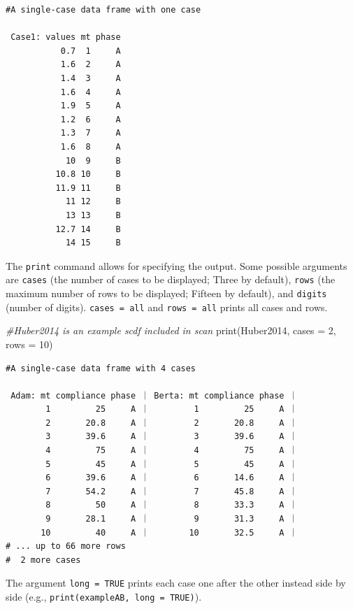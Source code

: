 \documentclass[
]{book}
\newenvironment{Shaded}{\begin{snugshade}}{\end{snugshade}}
\newcommand{\AttributeTok}[1]{\textcolor[rgb]{0.77,0.63,0.00}{#1}}
\newcommand{\CommentTok}[1]{\textcolor[rgb]{0.56,0.35,0.01}{\textit{#1}}}
\newcommand{\DecValTok}[1]{\textcolor[rgb]{0.00,0.00,0.81}{#1}}
\newcommand{\FunctionTok}[1]{\textcolor[rgb]{0.00,0.00,0.00}{#1}}
\newcommand{\NormalTok}[1]{#1}
\begin{document}
\begin{verbatim}
#A single-case data frame with one case

 Case1: values mt phase
           0.7  1     A
           1.6  2     A
           1.4  3     A
           1.6  4     A
           1.9  5     A
           1.2  6     A
           1.3  7     A
           1.6  8     A
            10  9     B
          10.8 10     B
          11.9 11     B
            11 12     B
            13 13     B
          12.7 14     B
            14 15     B
\end{verbatim}

The \texttt{print} command allows for specifying the output. Some possible arguments are \texttt{cases} (the number of cases to be displayed; Three by default), \texttt{rows} (the maximum number of rows to be displayed; Fifteen by default), and \texttt{digits} (number of digits). \texttt{cases\ =\ \textquotesingle{}all\textquotesingle{}} and \texttt{rows\ =\ \textquotesingle{}all\textquotesingle{}} prints all cases and rows.

\begin{Shaded}
\begin{Highlighting}[]
\CommentTok{\#Huber2014 is an example scdf included in scan}
\FunctionTok{print}\NormalTok{(Huber2014, }\AttributeTok{cases =} \DecValTok{2}\NormalTok{, }\AttributeTok{rows =} \DecValTok{10}\NormalTok{)}
\end{Highlighting}
\end{Shaded}

\begin{verbatim}
#A single-case data frame with 4 cases

 Adam: mt compliance phase ｜ Berta: mt compliance phase ｜
        1         25     A ｜         1         25     A ｜
        2       20.8     A ｜         2       20.8     A ｜
        3       39.6     A ｜         3       39.6     A ｜
        4         75     A ｜         4         75     A ｜
        5         45     A ｜         5         45     A ｜
        6       39.6     A ｜         6       14.6     A ｜
        7       54.2     A ｜         7       45.8     A ｜
        8         50     A ｜         8       33.3     A ｜
        9       28.1     A ｜         9       31.3     A ｜
       10         40     A ｜        10       32.5     A ｜
# ... up to 66 more rows
#  2 more cases
\end{verbatim}

The argument \texttt{long\ =\ TRUE} prints each case one after the other instead side by side (e.g., \texttt{print(exampleAB,\ long\ =\ TRUE)}).
\end{document}
